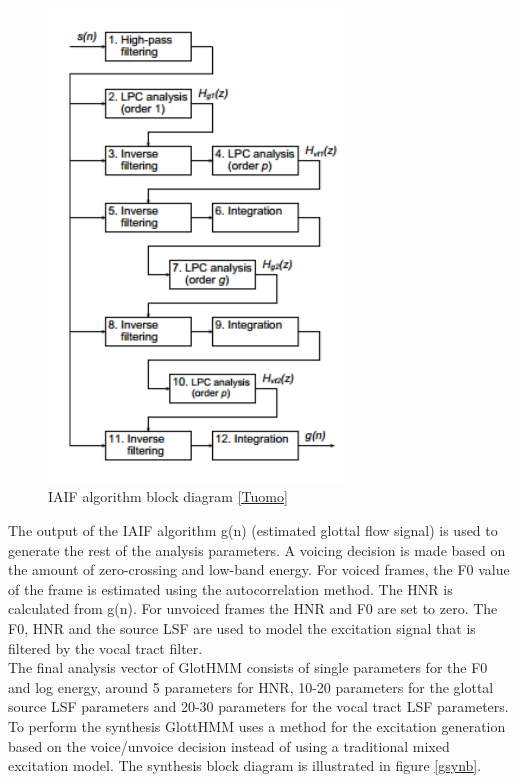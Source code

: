 \begin{figure}[!htb]
	\begin{center}
	\includegraphics[width=0.7\textwidth]{img/iaif.png}
	\end{center}
	\caption{\label{iaif}IAIF algorithm block diagram \ref{Tuomo}}
\end{figure}
The output of the IAIF algorithm g(n) (estimated glottal flow signal) is used to generate the rest of the analysis parameters. A voicing decision is made based on the amount of zero-crossing and low-band energy. For voiced frames, the F0 value of the frame is estimated using the autocorrelation method. The HNR is calculated from g(n). For unvoiced frames the HNR and F0 are set to zero. The F0, HNR and the source LSF are used to model the excitation signal that is filtered by the vocal tract filter.\\
The final analysis vector of GlotHMM consists of single parameters for the F0 and log energy, around 5 parameters for HNR, 10-20 parameters for the glottal source LSF parameters and 20-30 parameters for the vocal tract LSF parameters.\\ 
To perform the synthesis GlottHMM uses a method for the excitation generation based on the voice/unvoice decision instead of using a traditional mixed excitation model. The synthesis block diagram is illustrated  in figure \ref{gsynb}.\\
